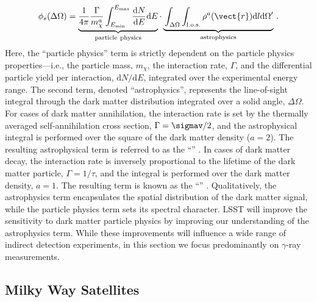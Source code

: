 \begin{equation}
   \phi_s(\Delta\Omega) =
    \underbrace{ \frac{1}{4\pi} \frac{\Gamma}{m_{\chi}^{a}}\int^{E_{\max}}_{E_{\min}}\frac{\text{d}N}{\text{d}E}\text{d}E}_{\rm particle\ physics}
    \cdot
    \underbrace{\vphantom{\int_{E_{\min}}} \int_{\Delta\Omega}\int_{\rm l.o.s.}\rho^{a}(\vect{r})\text{d}l\text{d}\Omega '}_{\rm astrophysics}\,.
    \label{eqn:indirect}
\end{equation}
\noindent Here, the ``particle physics'' term is strictly dependent on the particle physics properties---i.e., the particle mass, $m_\chi$,  the interaction rate, $\Gamma$, and the differential particle yield per interaction, $\text{d}N/\text{d}E$, integrated over the experimental energy range.
The second term, denoted ``astrophysics'', represents the line-of-sight integral through the dark matter distribution integrated over a solid angle, $\Delta\Omega$. 
For cases of dark matter annihilation, the interaction rate is set by the thermally averaged self-annihilation cross section, $\Gamma = \sigmav/2$, and the astrophysical integral is performed over the square of the dark matter density ($a=2$). 
The resulting astrophysical term is referred to as the ``\Jfactor'' \citep[\eg,][]{1998APh.....9..137B}. 
In cases of dark matter decay, the interaction rate is inversely proportional to the lifetime of the dark matter particle, $\Gamma = 1/\tau$, and the integral is performed over the dark matter density, $a=1$. 
The resulting term is known as the ``\Dfactor'' \citep[\eg][]{1408.0002}.
Qualitatively, the astrophysics term encapsulates the spatial distribution of the dark matter signal, while the particle physics term sets its spectral character. 
LSST will improve the sensitivity to dark matter particle physics by improving our understanding of the astrophysics term.
While these improvements will influence a wide range of indirect detection experiments, in this section we focus predominantly on $\gamma$-ray measurements.


\subsection{Milky Way Satellites }
\label{sec:dwarfs_id}

